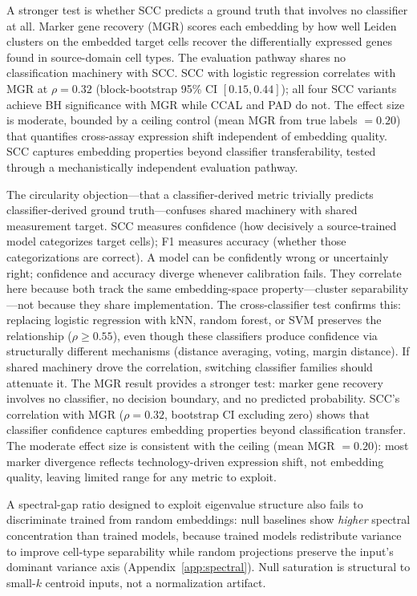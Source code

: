 \documentclass[11pt]{article}
\begin{document}
A stronger test is whether SCC predicts a ground truth that involves
no classifier at all. Marker gene recovery (MGR) scores each embedding
by how well Leiden clusters on the embedded target cells recover the
differentially expressed genes found in source-domain cell types. The
evaluation pathway shares no classification machinery with SCC. SCC
with logistic regression correlates with MGR at $\rho = 0.32$
(block-bootstrap 95\% CI $[0.15, 0.44]$); all four SCC variants
achieve BH significance with MGR while CCAL and PAD do not. The
effect size is moderate, bounded by a ceiling control (mean MGR from
true labels $= 0.20$) that quantifies cross-assay expression shift
independent of embedding quality. SCC captures embedding properties
beyond classifier transferability, tested through a mechanistically
independent evaluation pathway.

The circularity objection---that a classifier-derived metric trivially
predicts classifier-derived ground truth---confuses shared machinery
with shared measurement target. SCC measures confidence (how decisively
a source-trained model categorizes target cells); F1 measures accuracy
(whether those categorizations are correct). A model can be confidently
wrong or uncertainly right; confidence and accuracy diverge whenever
calibration fails. They correlate here because both track the same
embedding-space property---cluster separability---not because they share
implementation. The cross-classifier test confirms this: replacing
logistic regression with kNN, random forest, or SVM preserves the
relationship ($\rho \geq 0.55$), even though these classifiers produce
confidence via structurally different mechanisms (distance averaging,
voting, margin distance). If shared machinery drove the correlation,
switching classifier families should attenuate it. The MGR result
provides a stronger test: marker gene recovery involves no classifier,
no decision boundary, and no predicted probability. SCC's correlation
with MGR ($\rho = 0.32$, bootstrap CI excluding zero) shows that
classifier confidence captures embedding properties beyond
classification transfer. The moderate effect size is consistent with
the ceiling (mean MGR $= 0.20$): most marker divergence reflects
technology-driven expression shift, not embedding quality, leaving
limited range for any metric to exploit.

A spectral-gap ratio designed to exploit eigenvalue structure also
fails to discriminate trained from random embeddings: null baselines
show \emph{higher} spectral concentration than trained models, because
trained models redistribute variance to improve cell-type separability
while random projections preserve the input's dominant variance axis
(Appendix~\ref{app:spectral}). Null saturation is structural to
small-$k$ centroid inputs, not a normalization artifact.
\end{document}
